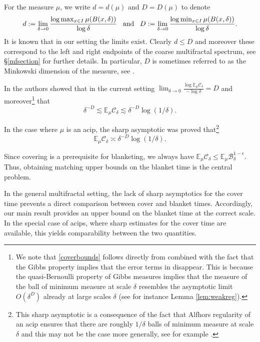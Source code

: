 \documentclass[11pt, reqno]{amsart}
\numberwithin{equation}{section}
\theoremstyle{plain}%
\theoremstyle{definition}
\def\B{\ensuremath{\mathcal B}}
\def\C{\ensuremath{\mathcal C}}
\renewcommand{\C}{\mathcal{C}}
\theoremstyle{nonumberplain}
\begin{document}
For the measure $\mu$, we write $d=d(\mu)$ and $D=D(\mu)$ to denote
\begin{equation}\label{minkowski}
 d:= \lim_{\delta \to 0} \frac{\log \max_{x \in I }\mu(B(x,\delta))}{\log \delta}\;\;\; \textnormal{and} \;\;\; D:= \lim_{\delta \to 0} \frac{\log \min_{x \in I }\mu(B(x,\delta))}{\log \delta}.
\end{equation}
It is known that in our setting the limits exist. Clearly $d \leq D$ and moreover these correspond to the left and right endpoints of the coarse multifractal spectrum, see \S \ref{mfsection} for further details. In particular, $D$ is sometimes referred to as the Minkowski dimension of the measure, see \cite{ffk}.

In \cite{JurTod25} the authors showed that in the current setting $\lim_{\delta \to 0} \frac{\log \mathbb{E}_\mu \C_\delta}{-\log \delta}= D$ and moreover\footnote{We note that \eqref{coverbounds} follows directly from \cite[Theorem 2.2]{JurTod25} combined with the fact that the Gibbs property implies that the error terms in \cite[Theorem 2.2]{JurTod25} disappear. This is because the quasi-Bernoulli property of Gibbs measures implies that the measure of the ball of
minimum measure at scale $\delta$ resembles the asymptotic limit $O(\delta^D)$ already at large scales $\delta$ (see for instance Lemma \ref{lem:weakreg}).} that
\begin{equation} \label{coverbounds}\delta^{-D} \lesssim\mathbb{E}_\mu \C_\delta \lesssim \delta^{-D} \log(1/\delta).\end{equation}
 

In the case where $\mu$ is an acip, the sharp asymptotic was proved that\footnote{This sharp asymptotic is a consequence of the fact that Alfhors regularity of an acip ensures that there are roughly $1/\delta$ balls of minimum measure at scale $\delta$ and this may not be the case more generally, see for example \cite[(1.2)]{chaosgame}.}
\begin{equation}
\mathbb{E}_\mu \C_\delta \asymp \delta^{-D} \log(1/\delta).
\label{covereqn}
\end{equation} 

Since covering is a prerequisite for blanketing, we always have 
$\mathbb{E}_\mu \C_\delta \leq \mathbb{E}_\mu \B_\delta^{1-\epsilon}$.
Thus, obtaining matching upper bounds on the blanket time is the central problem.

In the general multifractal setting, the lack of sharp asymptotics for the cover time prevents a direct comparison between cover and blanket times. Accordingly, our main result provides an upper bound on the blanket time at the correct scale. In the special case of acips, where sharp estimates for the cover time are available, this yields comparability between the two quantities.
\end{document}
